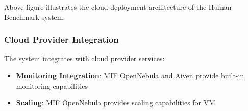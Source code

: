 Above figure illustrates the cloud deployment architecture of the Human Benchmark system.

\subsubsection{Cloud Provider Integration}

The system integrates with cloud provider services:

\begin{itemize}
    \item \textbf{Monitoring Integration}: MIF OpenNebula and Aiven provide built-in monitoring capabilities
    \item \textbf{Scaling}: MIF OpenNebula provides scaling capabilities for VM
\end{itemize}








